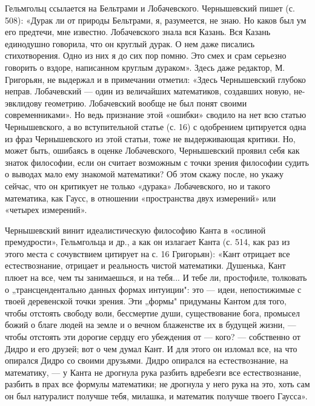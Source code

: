 Гельмгольц ссылается  на Бельтрами и Лобачевского.  Чернышевский пишет
(с. 508): «Дурак  ли от природы Бельтрами, я, разумеется,  не знаю. Но
каков  был  ум его  предтечи,  мне  известно. Лобачевского  знала  вся
Казань. Вся  Казань единодушно говорила,  что он круглый дурак.  О нем
даже писались стихотворения. Одно из них  я до сих пор помню. Это смех
и срам серьезно говорить о  вздоре, написанном круглым дураком». Здесь
даже  редактор, М.  Григорьян,  не выдержал  и  в примечании  отметил:
«Здесь Чернышевский глубоко неправ. Лобачевский --- один из величайших
математиков,  создавших  новую,  не-эвклидову  геометрию.  Лобачевский
вообще не  был понят  своими современниками».  Но ведь  признание этой
«ошибки» сводило на  нет всю статью Чернышевского,  а во вступительной
статье (с. 16)  с одобрением цитируется одна из  фраз Чернышевского из
этой статьи, тоже не выдерживающая критики. Но, может быть, ошибаясь в
оценке Лобачевского,  Чернышевский проявил себя как  знаток философии,
если он  считает возможным с  точки зрения философии судить  о выводах
мало ему  знакомой математики? Об  этом скажу после, но  укажу сейчас,
что  он  критикует  не  только  «дурака»  Лобачевского,  но  и  такого
математика, как  Гаусс, в отношении «пространства  двух измерений» или
«четырех измерений».

Чернышевский   винит  идеалистическую   философию  Канта   в  «ослиной
премудрости», Гельмгольца и др., а как  он излагает Канта (с. 514, как
раз из этого  места с сочувствием цитирует на с.  16 Григорьян): «Кант
отрицает все естествознание, отрицает  и реальность чистой математики.
Душенька,  Кант плюет  на  все, чем  ты занимаешься,  и  на тебя...  И
тебе  ли, простофиле,  толковать  о  „трансцендентально данных  формах
интуиции":  это  ---  идеи,  непостижимые с  твоей  деревенской  точки
зрения. Эти „формы" придуманы Кантом  для того, чтобы отстоять свободу
воли,  бессмертие души,  существование  бога, промысел  божий о  благе
людей на  земле и о  вечном блаженстве их  в будущей жизни,  --- чтобы
отстоять эти дорогие сердцу его  убеждения от --- кого? --- собственно
от Дидро и  его друзей; вот о  чем думал Кант. И для  этого он изломал
все,  на что  опирался Дидро  со  своими друзьями.  Дидро опирался  на
естествознание, на  математику, --- у  Канта не дрогнула  рука разбить
вдребезги все  естествознание, разбить в прах  все формулы математики;
не дрогнула  у него рука  на это, хоть  сам он был  натуралист получше
тебя, милашка, и математик получше твоего Гаусса».

